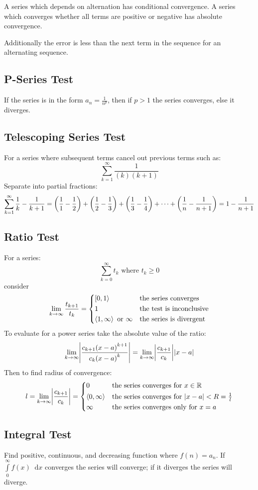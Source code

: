\documentclass[12pt]{article}
\DeclarePairedDelimiter\abs{\lvert}{\rvert}
\DeclarePairedDelimiter\paren{(}{)}
\newcommand*{\D}[1]{\mathop{}\!\mathrm{d}#1}
\newcommand*{\isum}[1]{\sum\limits_{#1}^\infty}
\begin{document}
A series which depends on alternation has conditional convergence. A series
which converges whether all terms are positive or negative has absolute
convergence.

Additionally the error is less than the next term in the sequence for an
alternating sequence.
\subsection*{P-Series Test}
If the series is in the form \(a_n = \frac{1}{n^p}\), then if \(p > 1\) the
series converges, else it diverges.
\subsection*{Telescoping Series Test}
For a series where subsequent terms cancel out previous terms such as:
\[
  \isum{k=1} \frac{1}{(k)(k+1)}
\]
Separate into partial fractions:
\[
  \isum{k=1} \frac{1}{k}-\frac{1}{k+1} = \paren*{\frac{1}{1} - \frac{1}{2}} +
  \paren*{\frac{1}{2} - \frac{1}{3}} + \paren*{\frac{1}{3} - \frac{1}{4}}
  + \cdots + \paren*{\frac{1}{n} - \frac{1}{n+1}}
  = 1 - \frac{1}{n+1}
\]
\subsection*{Ratio Test}
For a series:
\[
  \isum{k=0} t_k \text{ where } t_k \ge 0
\]
consider
\[
  \lim_{k \to \infty} \frac{t_{k+1}}{t_k} = \begin{dcases*}
    \left[0,1\right> & the series converges\\
    1 & the test is inconclusive\\
    \left<1,\infty\right> \text{ or } \infty  & the series is divergent
  \end{dcases*}
\]
To evaluate for a power series take the absolute value of the ratio:
\[
  \lim_{k \to \infty} \abs*{\frac{c_{k+1}{(x-a)}^{k+1}}{c_k{(x-a)}^k}}
  = \lim_{k \to \infty} \abs*{\frac{c_{k+1}}{c_k}}\abs*{x-a}
\]
Then to find radius of convergence:
\[
  l = \lim_{k \to \infty} \abs*{\frac{c_{k+1}}{c_k}} = \begin{dcases*}
    0 & the series converges for \(x \in \mathbb{R}\)\\
    \left<0,\infty\right> & the series converges for
      \(\abs*{x-a} < R = \tfrac{1}{l}\)\\
    \infty & the series converges only for \(x=a\)
  \end{dcases*}
\]
\subsection*{Integral Test}
Find positive, continuous, and decreasing function where \(f(n) = a_n\). If
\(\int\limits_0^\infty f(x) \D{x}\) converges the series will converge; if it
diverges the series will diverge.
\end{document}

